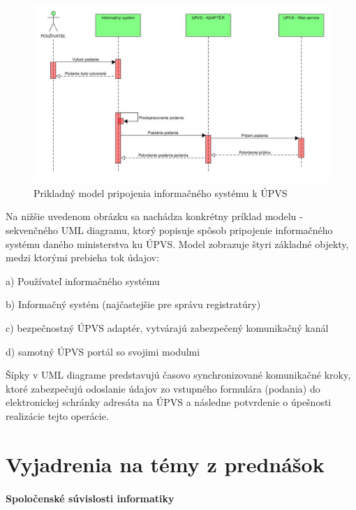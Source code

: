 \documentclass[10pt,twoside,slovak,a4paper]{article}
\begin{document}
\begin{figure}[h!]
\centering
\includegraphics[width=\textwidth]{Images/Obr3.jpg}
\caption{Prikladný model pripojenia informačného systému k ÚPVS\cite{UMLetJa}}
\label{Model}
\end{figure}

Na nižšie uvedenom obrázku sa nachádza konkrétny príklad modelu - sekvenčného UML diagramu, ktorý popisuje spôsob pripojenie informačného systému daného ministerstva ku ÚPVS. Model zobrazuje štyri základné objekty, medzi ktorými prebieha tok údajov:
\begin{description}
\item a)        Používateľ informačného systému
\item b)        Informačný systém (najčastejšie pre správu registratúry)
\item c)        bezpečnostný ÚPVS adaptér, vytvárajú zabezpečený komunikačný kanál
\item d)        samotný ÚPVS portál so svojimi modulmi
\end{description}
Šípky v UML diagrame predstavujú časovo synchronizované komunikačné kroky, ktoré zabezpečujú odoslanie údajov zo vstupného formulára (podania) do elektronickej schránky adresáta na ÚPVS a následne potvrdenie o úpešnosti realizácie tejto operácie.\newline



\newpage
\section{Vyjadrenia na témy z prednášok} \label{5sek}


\paragraph{Spoločenské súvislosti informatiky}
\end{document}

